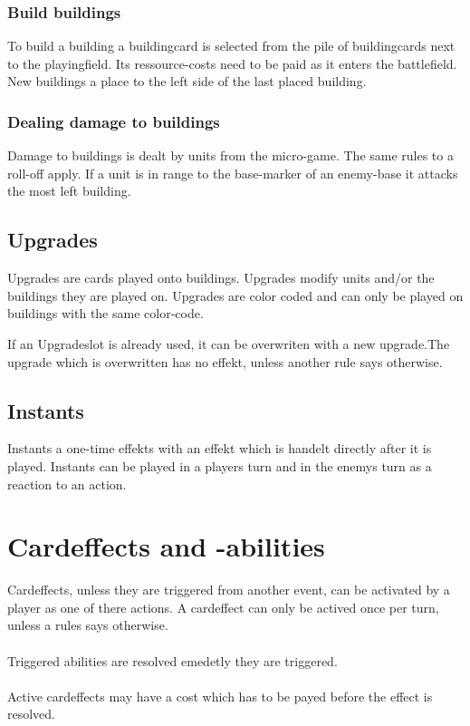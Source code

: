 \documentclass[a5paper,pagesize,10pt,bibtotoc,pointlessnumbers,
normalheadings,DIV=9,twoside=false]{scrbook}
\begin{document}
\subsubsection{Build buildings}
To build a building a buildingcard is selected from the pile of buildingcards next to the playingfield. Its ressource-costs need to be paid as it enters the battlefield.
New buildings a place to the left side of the last placed building.

\subsubsection{Dealing damage to buildings}
Damage to buildings is dealt by units from the micro-game. The same rules to a roll-off apply. If a unit is in range to the base-marker of an enemy-base it attacks the most left building.

\subsection{Upgrades}
Upgrades are cards played onto buildings. Upgrades modify units and/or the buildings they are played on. Upgrades are color coded and can only be played on buildings with the same color-code.

If an Upgradeslot is already used, it can be overwriten with a new upgrade.The upgrade which is overwritten has no effekt, unless another rule says otherwise.

\subsection{Instants}
Instants a one-time effekts with an effekt which is handelt directly after it is played. Instants can be played in a players turn and in the enemys turn as a reaction to an action.

\section{Cardeffects and -abilities}
Cardeffects, unless they are triggered from another event, can be activated by a player as one of there actions. A cardeffect can only be actived once per turn, unless a rules says otherwise.\\
\\
Triggered abilities are resolved emedetly they are triggered.\\
\\
Active cardeffects may have a cost which has to be payed before the effect is resolved.
\end{document}
